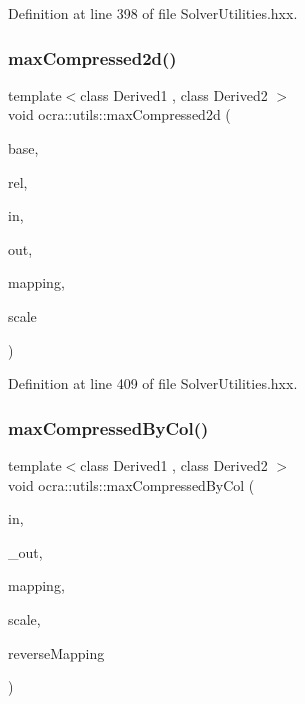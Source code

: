 Definition at line 398 of file Solver\+Utilities.\+hxx.

\hypertarget{namespaceocra_1_1utils_ab1811bfb0b7d5ab451e9fea88093027e}{}\label{namespaceocra_1_1utils_ab1811bfb0b7d5ab451e9fea88093027e} 
\subsubsection{\texorpdfstring{max\+Compressed2d()}{maxCompressed2d()}\hspace{0.1cm}{\footnotesize\ttfamily [2/2]}}
{\footnotesize\ttfamily template$<$class Derived1 , class Derived2 $>$ \\
void ocra\+::utils\+::max\+Compressed2d (\begin{DoxyParamCaption}\item[{const \hyperlink{classocra_1_1Variable}{Variable} \&}]{base,  }\item[{const \hyperlink{classocra_1_1Variable}{Variable} \&}]{rel,  }\item[{const Matrix\+Base$<$ Derived1 $>$ \&}]{in,  }\item[{Matrix\+Base$<$ Derived2 $>$ const \&}]{out,  }\item[{std\+::vector$<$ int $>$ \&}]{mapping,  }\item[{double}]{scale }\end{DoxyParamCaption})\hspace{0.3cm}{\ttfamily [inline]}}



Definition at line 409 of file Solver\+Utilities.\+hxx.

\hypertarget{namespaceocra_1_1utils_a9de6baf9d21a683ff798695ac099055a}{}\label{namespaceocra_1_1utils_a9de6baf9d21a683ff798695ac099055a} 
\subsubsection{\texorpdfstring{max\+Compressed\+By\+Col()}{maxCompressedByCol()}\hspace{0.1cm}{\footnotesize\ttfamily [1/2]}}
{\footnotesize\ttfamily template$<$class Derived1 , class Derived2 $>$ \\
void ocra\+::utils\+::max\+Compressed\+By\+Col (\begin{DoxyParamCaption}\item[{const Matrix\+Base$<$ Derived1 $>$ \&}]{in,  }\item[{Matrix\+Base$<$ Derived2 $>$ const \&}]{\+\_\+out,  }\item[{const std\+::vector$<$ int $>$ \&}]{mapping,  }\item[{double}]{scale,  }\item[{bool}]{reverse\+Mapping }\end{DoxyParamCaption})\hspace{0.3cm}{\ttfamily [inline]}}



